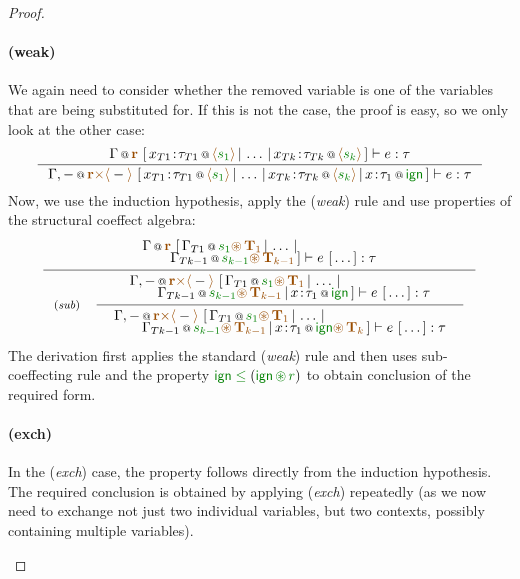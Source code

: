 \begin{proof}
\begin{itemize}
\paragraph{(weak)} We again need to consider whether the removed variable is 
one of the variables that are being substituted for. If this is not the case,
the proof is easy, so we only look at the other case:
\[
\inference
  {\coctx{\Gamma}{ \aclrd{\textbf{r}} }~
   [\,\coctx{x_{T1}\!:\!\tau_{T1}}{\alift{\cclrd{s_1}}} \,|\, \ldots \,|\, \coctx{x_{Tk}\!:\!\tau_{Tk}}{\alift{\cclrd{s_k}}}\,]
   \vdash e : \tau}
  {\coctx{\Gamma, -}{\aclrd{\textbf{r}} \atimes \alift{ - }}~
   [\,\coctx{x_{T1}\!:\!\tau_{T1}}{\alift{\cclrd{s_1}}} \,|\, \ldots \,|\, \coctx{x_{Tk}\!:\!\tau_{Tk}}{\alift{\cclrd{s_k}}}\,|\,\coctx{x\!:\!\tau_1}{\czero}\,]
   \vdash e : \tau} 
\]
Now, we use the induction hypothesis, apply the (\emph{weak}) rule and use properties of the
structural coeffect algebra:
\[
\inference
  {{ \begin{array}{l}
    \coctx{\Gamma}{ \aclrd{\textbf{r}} }~
    [\,\coctx{\Gamma_{T1}}{\cclrd{s_1}\aseq\,\aclrd{\textbf{T}_1}} \,|\, \ldots \,|\, 
     \\[-0.35em] \qquad
     \coctx{\Gamma_{Tk-1}}{\cclrd{s_{k-1}}\aseq\,\aclrd{\textbf{T}_{k-1}}}\,]
   \vdash e~[\,\ldots\,] : \tau 
   \end{array} }}
{\tyrule{sub}
 {{\begin{array}{l}
   \coctx{\Gamma, -}{\aclrd{\textbf{r}} \atimes \alift{ - }}~
   [\,\coctx{\Gamma_{T1}}{\cclrd{s_1}\aseq\,\aclrd{\textbf{T}_1}} \,|\, \ldots \,|\, 
    \\[-0.35em] \qquad
    \coctx{\Gamma_{Tk-1}}{\cclrd{s_{k-1}}\aseq\,\aclrd{\textbf{T}_{k-1}}}
      \,|\,\coctx{x\!:\!\tau_1}{\czero}\,]
   \vdash e~[\,\ldots\,] : \tau
   \end{array} }} 
 {{\begin{array}{l}
   \coctx{\Gamma, -}{\aclrd{\textbf{r}} \atimes \alift{ - }}~
   [\,\coctx{\Gamma_{T1}}{\cclrd{s_1}\aseq\,\aclrd{\textbf{T}_1}} \,|\, \ldots \,|\, 
    \\[-0.35em] \qquad
    \coctx{\Gamma_{Tk-1}}{\cclrd{s_{k-1}}\aseq\,\aclrd{\textbf{T}_{k-1}}}
      \,|\,\coctx{x\!:\!\tau_1}{\czero \aseq\,\aclrd{\textbf{T}_k} }\,]
   \vdash e~[\,\ldots\,] : \tau
   \end{array} }}  }
\]
The derivation first applies the standard (\emph{weak}) rule and then uses sub-coeffecting
rule and the property $\czero\;\cleq\;(\czero\,\cseq\,\cclrd{r})$ to obtain conclusion of the required form.

\paragraph{(exch)} In the (\emph{exch}) case, the property follows directly from the 
induction hypothesis. The required conclusion is obtained by applying (\emph{exch}) 
repeatedly (as we now need to exchange not just two individual variables, but two 
contexts, possibly containing multiple variables).

\end{itemize}
\end{proof}


